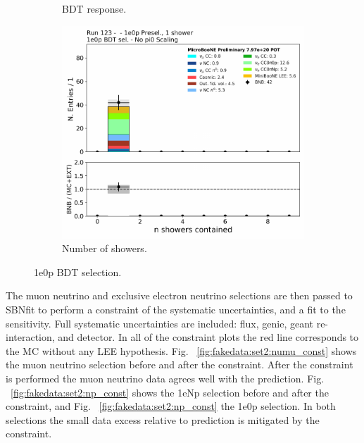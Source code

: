 \begin{figure}[H]
\begin{center}
\begin{subfigure}[b]{0.3\textwidth}
    \caption{\label{fig:fakedata:set2:zp_postsel_bdt} BDT response.}
    \end{subfigure}
    \begin{subfigure}[b]{0.3\textwidth}
    \centering
    \includegraphics[width=1.00\textwidth]{Fakedata/set2/zp_postsel_nshr.pdf}
    \caption{\label{fig:fakedata:set2:zp_postsel_nshr} Number of showers.}
    \end{subfigure}
\caption{\label{fig:fakedata:set2:zpsel} 1e0p BDT selection.}
\end{center}
\end{figure}

The muon neutrino and exclusive electron neutrino selections are then passed to SBNfit to perform a constraint of the systematic uncertainties, and a fit to the sensitivity.  Full systematic uncertainties are included: flux, genie, geant re-interaction, and detector.  In all of the constraint plots the red line corresponds to the MC without any LEE hypothesis. Fig. ~\ref{fig:fakedata:set2:numu_const} shows the muon neutrino selection before and after the constraint. After the constraint is performed the muon neutrino data agrees well with the prediction.   
Fig. ~\ref{fig:fakedata:set2:np_const} shows the 1eNp selection before and after the constraint, and Fig. ~\ref{fig:fakedata:set2:np_const} the 1e0p selection.  In both selections the small data excess relative to prediction is  mitigated by the constraint.

